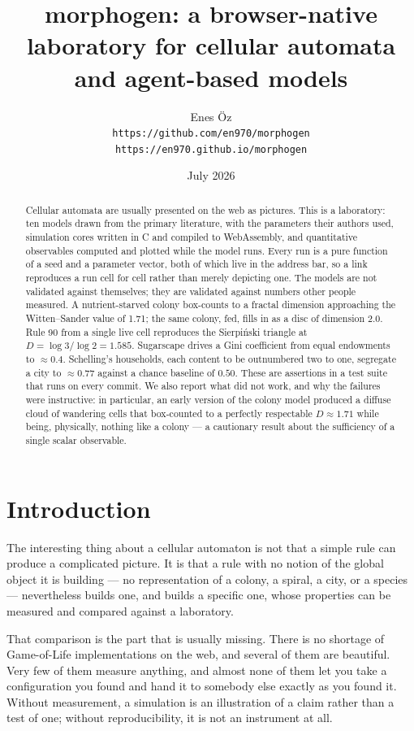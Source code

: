 \documentclass[11pt,a4paper]{article}
\title{\textbf{morphogen}: a browser-native laboratory for cellular automata\\
       and agent-based models}
\author{Enes \"Oz\\[2pt]
        \small\texttt{https://github.com/en970/morphogen}\\
        \small\texttt{https://en970.github.io/morphogen}}
\date{July 2026}
\begin{document}
\maketitle

\begin{abstract}
\noindent
Cellular automata are usually presented on the web as pictures. This is a
laboratory: ten models drawn from the primary literature, with the parameters
their authors used, simulation cores written in C and compiled to WebAssembly,
and quantitative observables computed and plotted while the model runs. Every run
is a pure function of a seed and a parameter vector, both of which live in the
address bar, so a link reproduces a run cell for cell rather than merely
depicting one. The models are not validated against themselves; they are
validated against numbers other people measured. A nutrient-starved colony
box-counts to a fractal dimension approaching the Witten--Sander value of
\num{1.71}; the same colony, fed, fills in as a disc of dimension \num{2.0}. Rule
90 from a single live cell reproduces the Sierpi\'{n}ski triangle at
$D=\log 3/\log 2=\num{1.585}$. Sugarscape drives a Gini coefficient from equal
endowments to $\approx\!\num{0.4}$. Schelling's households, each content to be
outnumbered two to one, segregate a city to $\approx\!\num{0.77}$ against a
chance baseline of $\num{0.50}$. These are assertions in a test suite that runs on
every commit. We also report what did not work, and why the failures were
instructive: in particular, an early version of the colony model produced a
diffuse cloud of wandering cells that box-counted to a perfectly respectable
$D\approx\num{1.71}$ while being, physically, nothing like a colony --- a
cautionary result about the sufficiency of a single scalar observable.
\end{abstract}

\section{Introduction}

The interesting thing about a cellular automaton is not that a simple rule can
produce a complicated picture. It is that a rule with no notion of the global
object it is building --- no representation of a colony, a spiral, a city, or a
species --- nevertheless builds one, and builds a specific one, whose properties
can be measured and compared against a laboratory.

That comparison is the part that is usually missing. There is no shortage of
Game-of-Life implementations on the web, and several of them are beautiful. Very
few of them measure anything, and almost none of them let you take a
configuration you found and hand it to somebody else exactly as you found it.
Without measurement, a simulation is an illustration of a claim rather than a
test of one; without reproducibility, it is not an instrument at all.
\end{document}
